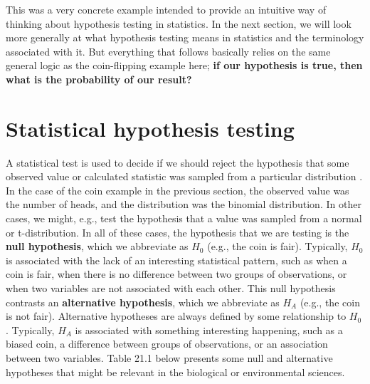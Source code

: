 \documentclass[
  openany]{krantz}
\begin{document}
This was a very concrete example intended to provide an intuitive way of thinking about hypothesis testing in statistics.
In the next section, we will look more generally at what hypothesis testing means in statistics and the terminology associated with it.
But everything that follows basically relies on the same general logic as the coin-flipping example here; \textbf{if our hypothesis is true, then what is the probability of our result?}

\hypertarget{statistical-hypothesis-testing}{%
\section{Statistical hypothesis testing}\label{statistical-hypothesis-testing}}

A statistical test is used to decide if we should reject the hypothesis that some observed value or calculated statistic was sampled from a particular distribution \citep{Sokal1995}.
In the case of the coin example in the previous section, the observed value was the number of heads, and the distribution was the binomial distribution.
In other cases, we might, e.g., test the hypothesis that a value was sampled from a normal or t-distribution.
In all of these cases, the hypothesis that we are testing is the \textbf{null hypothesis}, which we abbreviate as \(H_{0}\) (e.g., the coin is fair).
Typically, \(H_{0}\) is associated with the lack of an interesting statistical pattern, such as when a coin is fair, when there is no difference between two groups of observations, or when two variables are not associated with each other.
This null hypothesis contrasts an \textbf{alternative hypothesis}, which we abbreviate as \(H_{A}\) (e.g., the coin is not fair).
Alternative hypotheses are always defined by some relationship to \(H_{0}\) \citep{Sokal1995}.
Typically, \(H_{A}\) is associated with something interesting happening, such as a biased coin, a difference between groups of observations, or an association between two variables.
Table 21.1 below presents some null and alternative hypotheses that might be relevant in the biological or environmental sciences.
\end{document}
